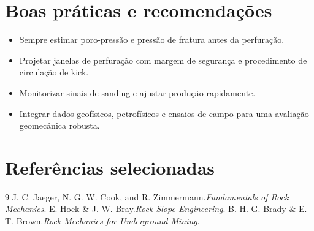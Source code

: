 \documentclass[12pt,a4paper]{article}
\begin{document}
\section{Boas pr\'aticas e recomenda\c{c}\~oes}
\begin{itemize}[noitemsep]
  \item Sempre estimar poro-press\~ao e press\~ao de fratura antes da perfura\c{c}\~ao.
  \item Projetar janelas de perfura\c{c}\~ao com margem de seguran\c{c}a e procedimento de circulação de kick.
  \item Monitorizar sinais de sanding e ajustar produ\c{c}\~ao rapidamente.
  \item Integrar dados geof\'isicos, petrof\'isicos e ensaios de campo para uma avalia\c{c}\~ao geomec\^anica robusta.
\end{itemize}

\section{Refer\^encias selecionadas}
\begin{thebibliography}{9}
 J. C. Jaeger, N. G. W. Cook, and R. Zimmermann.\textit{Fundamentals of Rock Mechanics}.
 E. Hoek \& J. W. Bray.\textit{Rock Slope Engineering}.
 B. H. G. Brady \& E. T. Brown.\textit{Rock Mechanics for Underground Mining}.
\end{thebibliography}
\end{document}
